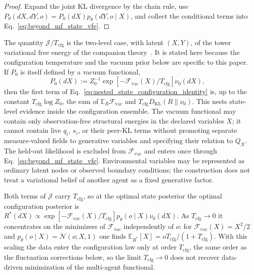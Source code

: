 \documentclass[11pt]{article}
\begin{document}
\begin{proof}
Expand the joint KL divergence by the chain rule, use $P_\theta(dX,dY,o)=P_0(dX)p_\theta(dY,o\mid X)$, and collect the conditional terms into Eq.~\eqref{eq:beyond_mf_state_vfe}.
\end{proof}

The quantity $\mathcal{J}/T_{\mathrm{cfg}}$ is the two-level case, with latent $(X,Y)$, of the tower variational free energy of the companion theory~\cite[Ch.~12]{DennisGaugeVFE2026}. It is stated here because the configuration temperature and the vacuum prior below are specific to this paper. If $P_0$ is itself defined by a vacuum functional,
\begin{equation}
P_0(dX)
:=Z_0^{-1}\exp[-\mathcal{F}_{\mathrm{vac}}(X)/T_{\mathrm{cfg}}]\nu_0(dX),
\label{eq:beyond_mf_configuration_prior}
\end{equation}
then the first term of Eq.~\eqref{eq:nested_state_configuration_identity} is, up to the constant $T_{\mathrm{cfg}}\log Z_0$, the sum of $\mathbb{E}_R\mathcal{F}_{\mathrm{vac}}$ and $T_{\mathrm{cfg}}D_{\mathrm{KL}}(R\|\nu_0)$. This nests state-level evidence inside the configuration ensemble. The vacuum functional may contain only observation-free structural energies in the declared variables $X$; it cannot contain live $q_i$, $s_i$, or their peer-KL terms without promoting separate measure-valued fields to generative variables and specifying their relation to $Q_X$. The held-out likelihood is excluded from $\mathcal{F}_{\mathrm{vac}}$ and enters once through Eq.~\eqref{eq:beyond_mf_state_vfe}. Environmental variables may be represented as ordinary latent nodes or observed boundary conditions; the construction does not treat a variational belief of another agent as a fixed generative factor.

Both terms of $\mathcal{J}$ carry $T_{\mathrm{cfg}}$, so at the optimal state posterior the optimal configuration posterior is $R^*(dX)\propto\exp[-\mathcal{F}_{\mathrm{vac}}(X)/T_{\mathrm{cfg}}]p_\theta(o\mid X)\nu_0(dX)$. As $T_{\mathrm{cfg}}\to0$ it concentrates on the minimizers of $\mathcal{F}_{\mathrm{vac}}$ independently of $o$: for $\mathcal{F}_{\mathrm{vac}}(X)=X^2/2$ and $p_\theta(o\mid X)=\mathcal{N}(o;X,1)$ one finds $\mathbb{E}_{R^*}[X]=oT_{\mathrm{cfg}}/(1+T_{\mathrm{cfg}})$. With this scaling the data enter the configuration law only at order $T_{\mathrm{cfg}}$, the same order as the fluctuation corrections below, so the limit $T_{\mathrm{cfg}}\to0$ does not recover data-driven minimization of the multi-agent functional.
\end{document}
